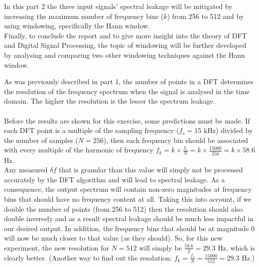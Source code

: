In this part 2 the three input signals' spectral leakage will be mitigated by increasing the maximum number of frequency bins ($k$) from 256 to 512 and by using windowing, specifically the Hann window.\\

Finally, to conclude the report and to give more insight into the theory of DFT and Digital Signal Processing, the topic of windowing will be further developed by analysing and comparing two other windowing techniques against the Hann window.

As was previously described in part 1, the number of points in a DFT determines the resolution of the frequency spectrum when the signal is analysed in the time domain. The higher the resolution is the lesser the spectrum leakage.

\paragraph{}
Before the results are shown for this exercise, some predictions must be made. If each DFT point is a multiple of the sampling frequency ($f_s = 15$ kHz) divided by the number of samples ($N = 256$), then each frequency bin should be associated with every multiple of the harmonic of frequency $f_k = k \times \frac{f_s}{N} = k \times \frac{15000}{256} = k\times 58.6$ Hz.\\

Any measured $\delta f$ that is granular than this value will simply not be processed accurately by the DFT algorithm and will lead to spectral leakage. As a consequence, the output spectrum will contain non-zero magnitudes at frequency bins that should have no frequency content at all. Taking this into account, if we double the number of points (from 256 to 512) then the resolution should also double inversely and as a result spectral leakage should be much less impactful in our desired output. In addition, the frequency bins that should be at magnitude 0 will now be much closer to that value (as they should). So, for this new experiment, the new resolution for $N = 512$ will simply be $\frac{58.6}{2} = 29.3$ Hz, which is clearly better. (Another way to find out the resolution: $f_k = \frac{f_s}{N} = \frac{15000}{512} = 29.3$ Hz.)

